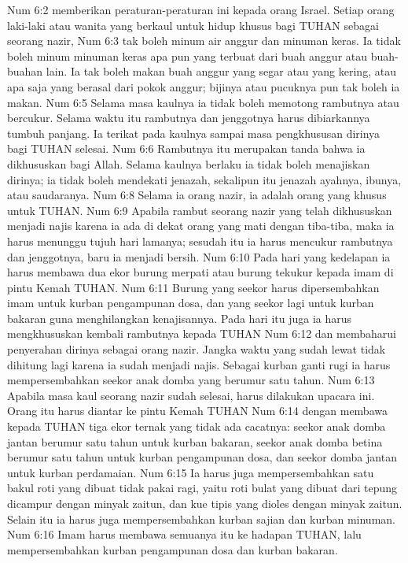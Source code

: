 Num 6:2  memberikan peraturan-peraturan ini kepada orang Israel. Setiap orang laki-laki atau wanita yang berkaul untuk hidup khusus bagi TUHAN sebagai seorang nazir,
Num 6:3  tak boleh minum air anggur dan minuman keras. Ia tidak boleh minum minuman keras apa pun yang terbuat dari buah anggur atau buah-buahan lain. Ia tak boleh makan buah anggur yang segar atau yang kering, atau apa saja yang berasal dari pokok anggur; bijinya atau pucuknya pun tak boleh ia makan.
Num 6:5  Selama masa kaulnya ia tidak boleh memotong rambutnya atau bercukur. Selama waktu itu rambutnya dan jenggotnya harus dibiarkannya tumbuh panjang. Ia terikat pada kaulnya sampai masa pengkhususan dirinya bagi TUHAN selesai.
Num 6:6  Rambutnya itu merupakan tanda bahwa ia dikhususkan bagi Allah. Selama kaulnya berlaku ia tidak boleh menajiskan dirinya; ia tidak boleh mendekati jenazah, sekalipun itu jenazah ayahnya, ibunya, atau saudaranya.
Num 6:8  Selama ia orang nazir, ia adalah orang yang khusus untuk TUHAN.
Num 6:9  Apabila rambut seorang nazir yang telah dikhususkan menjadi najis karena ia ada di dekat orang yang mati dengan tiba-tiba, maka ia harus menunggu tujuh hari lamanya; sesudah itu ia harus mencukur rambutnya dan jenggotnya, baru ia menjadi bersih.
Num 6:10  Pada hari yang kedelapan ia harus membawa dua ekor burung merpati atau burung tekukur kepada imam di pintu Kemah TUHAN.
Num 6:11  Burung yang seekor harus dipersembahkan imam untuk kurban pengampunan dosa, dan yang seekor lagi untuk kurban bakaran guna menghilangkan kenajisannya. Pada hari itu juga ia harus mengkhususkan kembali rambutnya kepada TUHAN
Num 6:12  dan membaharui penyerahan dirinya sebagai orang nazir. Jangka waktu yang sudah lewat tidak dihitung lagi karena ia sudah menjadi najis. Sebagai kurban ganti rugi ia harus mempersembahkan seekor anak domba yang berumur satu tahun.
Num 6:13  Apabila masa kaul seorang nazir sudah selesai, harus dilakukan upacara ini. Orang itu harus diantar ke pintu Kemah TUHAN
Num 6:14  dengan membawa kepada TUHAN tiga ekor ternak yang tidak ada cacatnya: seekor anak domba jantan berumur satu tahun untuk kurban bakaran, seekor anak domba betina berumur satu tahun untuk kurban pengampunan dosa, dan seekor domba jantan untuk kurban perdamaian.
Num 6:15  Ia harus juga mempersembahkan satu bakul roti yang dibuat tidak pakai ragi, yaitu roti bulat yang dibuat dari tepung dicampur dengan minyak zaitun, dan kue tipis yang dioles dengan minyak zaitun. Selain itu ia harus juga mempersembahkan kurban sajian dan kurban minuman.
Num 6:16  Imam harus membawa semuanya itu ke hadapan TUHAN, lalu mempersembahkan kurban pengampunan dosa dan kurban bakaran.
